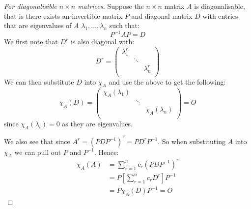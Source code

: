 \documentclass[../main.tex]{subfiles}
\begin{document}
\begin{proof}[For diagonalisible $n \times n$ matrices]
  Suppose the $n \times n$ matrix $A$ is diagonalisable, that is there exists an invertible matrix $P$ and diagonal matrix $D$ with entries that are eigenvalues of $A$ $\lambda_1, \ldots, \lambda_n$ such that:
  \[
    P^{-1} A P = D
  \]
  We first note that $D^{r}$ is also diagonal with:
  \[
    D^{r} = \begin{pmatrix}
    \lambda^{r}_{1} &  & \\
     & \ddots &  \\
     &  & \lambda^{r}_{n} \\
    \end{pmatrix}
  \]
  We can then substitute $D$ into $\chi_A$ and use the above to get the following:
  \[
    \chi_A(D) = \begin{pmatrix}
      \chi_A(\lambda_1) &  &  \\
                        & \ddots &  \\
                        &  & \chi_A(\lambda_n) \\
    \end{pmatrix} = O
  \]
  since $\chi_A(\lambda_i) = 0$ as they are eigenvalues.

  We also see that since $A^{r} = (PDP^{-1})^{r} = PD^{r}P^{-1}$.
  So when substituting $A$ into $\chi_A$ we can pull out $P$ and $P^{-1}$.
  Hence:
  \begin{align*}
    \chi_A(A) &= \sum_{r = 1}^{n} c_r (PDP^{-1})^{r} \\
              &= P\left[\sum_{r = 1}^{n} c_r D^{r}\right]P^{-1} \\
              &= P\chi_A(D)P^{-1} = O
  \end{align*}
\end{proof}
\end{document}
